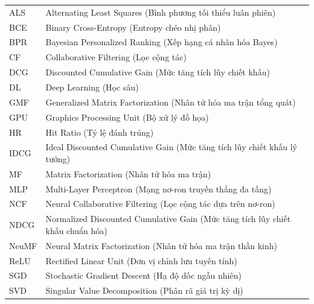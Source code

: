 {
\renewcommand{\arraystretch}{1.4} 
\noindent
\begin{tabular}{p{2.5cm} p{11.5cm}}
ALS & Alternating Least Squares (Bình phương tối thiểu luân phiên) \\
BCE & Binary Cross-Entropy (Entropy chéo nhị phân) \\
BPR & Bayesian Personalized Ranking (Xếp hạng cá nhân hóa Bayes) \\
CF & Collaborative Filtering (Lọc cộng tác) \\
DCG & Discounted Cumulative Gain (Mức tăng tích lũy chiết khấu) \\
DL & Deep Learning (Học sâu) \\
GMF & Generalized Matrix Factorization (Nhân tử hóa ma trận tổng quát) \\
GPU & Graphics Processing Unit (Bộ xử lý đồ họa) \\
HR & Hit Ratio (Tỷ lệ đánh trúng) \\
IDCG & Ideal Discounted Cumulative Gain (Mức tăng tích lũy chiết khấu lý tưởng) \\
MF & Matrix Factorization (Nhân tử hóa ma trận) \\
MLP & Multi-Layer Perceptron (Mạng nơ-ron truyền thẳng đa tầng) \\
NCF & Neural Collaborative Filtering (Lọc cộng tác dựa trên nơ-ron) \\
NDCG & Normalized Discounted Cumulative Gain (Mức tăng tích lũy chiết khấu chuẩn hóa) \\
NeuMF & Neural Matrix Factorization (Nhân tử hóa ma trận thần kinh) \\
ReLU & Rectified Linear Unit (Đơn vị chỉnh lưu tuyến tính) \\
SGD & Stochastic Gradient Descent (Hạ độ dốc ngẫu nhiên) \\
SVD & Singular Value Decomposition (Phân rã giá trị kỳ dị) \\
\end{tabular}
} 
\clearpage